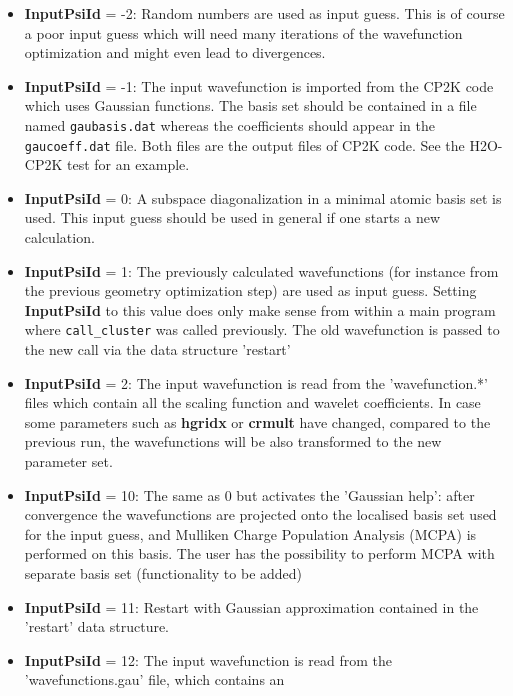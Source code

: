 \documentclass[a4paper,11pt]{report}
\begin{document}
\begin{itemize}
      \begin{itemize}
      \item {\bf InputPsiId } = -2: Random numbers are used as input guess. This is of course a poor input guess which will 
            need many iterations of the wavefunction optimization and might even lead to divergences.
      \item {\bf InputPsiId } = -1: The input wavefunction is imported from the CP2K code which
            uses Gaussian functions. 
            The basis set should be contained in a file named \texttt{gaubasis.dat} 
            whereas the coefficients should appear in the \texttt{gaucoeff.dat} file. 
            Both files are the output files of CP2K code. See the H2O-CP2K test for an example.
      \item {\bf InputPsiId } = 0: A subspace diagonalization in a minimal atomic basis set is used.
            This input guess should be used in general if one starts a new calculation. 
      \item {\bf InputPsiId } = 1: The previously calculated wavefunctions (for instance from the previous 
            geometry optimization step) are used as input guess. Setting {\bf InputPsiId } to 
            this value does only make sense from within a main program where \texttt{call\_cluster} was 
            called previously. The old wavefunction is passed to the new call via the data structure 'restart'
      \item {\bf InputPsiId } = 2: The input wavefunction is read from the 'wavefunction.*' files which contain all the 
            scaling function and wavelet coefficients. In case some parameters such as {\bf hgridx} 
            or {\bf crmult} have changed, compared to the previous run, the wavefunctions will be 
            also transformed to the new parameter set.
      \item {\bf InputPsiId } = 10: The same as 0 but activates the 'Gaussian help': 
            after convergence the wavefunctions are projected onto the localised basis set used for
            the input guess, and Mulliken Charge Population Analysis (MCPA) is performed on this
            basis. The user has the possibility to perform MCPA with separate basis set (functionality to be added)
       \item {\bf InputPsiId } = 11: Restart with Gaussian approximation contained in the 'restart' data structure.
       \item {\bf InputPsiId } = 12: The input wavefunction is read from the 'wavefunctions.gau'  file, which contains an 

\end{itemize}
\end{itemize}
\end{document}
